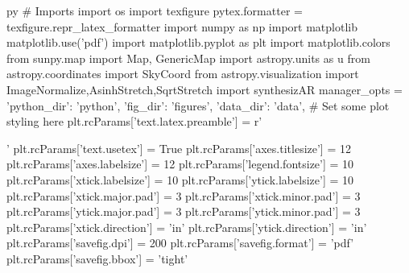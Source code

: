 \begin{pythontexcustomcode}{py}
# Imports
import os
import texfigure
pytex.formatter = texfigure.repr_latex_formatter
import numpy as np
import matplotlib
matplotlib.use('pdf')
import matplotlib.pyplot as plt
import matplotlib.colors
from sunpy.map import Map, GenericMap
import astropy.units as u
from astropy.coordinates import SkyCoord
from astropy.visualization import ImageNormalize,AsinhStretch,SqrtStretch
import synthesizAR
manager_opts = {'python_dir': 'python', 'fig_dir': 'figures', 'data_dir': 'data',}
# Set some plot styling here
plt.rcParams['text.latex.preamble'] = r'\usepackage{fourier}'
plt.rcParams['text.usetex'] = True
plt.rcParams['axes.titlesize'] = 12
plt.rcParams['axes.labelsize'] = 12
plt.rcParams['legend.fontsize'] = 10
plt.rcParams['xtick.labelsize'] = 10
plt.rcParams['ytick.labelsize'] = 10
plt.rcParams['xtick.major.pad'] = 3
plt.rcParams['xtick.minor.pad'] = 3
plt.rcParams['ytick.major.pad'] = 3
plt.rcParams['ytick.minor.pad'] = 3
plt.rcParams['xtick.direction'] = 'in'
plt.rcParams['ytick.direction'] = 'in'
plt.rcParams['savefig.dpi'] = 200
plt.rcParams['savefig.format'] = 'pdf'
plt.rcParams['savefig.bbox'] = 'tight'
\end{pythontexcustomcode}
